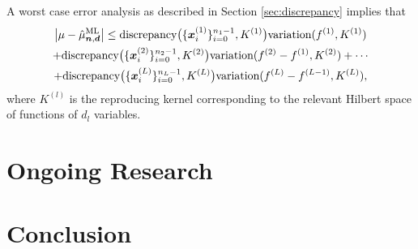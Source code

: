 \documentclass{svproc}
\begin{document}
A worst case error analysis as described in Section \ref{sec:discrepancy} implies that
\begin{multline*}
    \bigl \lvert \mu - \hat{\mu}^{\text{ML}}_{{\boldsymbol{n}},{\boldsymbol{d}}} \bigr \rvert \le 
    \text{discrepancy}\bigl(\{{\boldsymbol{x}}_i^{(1)}\}_{i=0}^{n_1-1}, K^{(1)} \bigr) \text{variation}(f^{(1)}, K^{(1)}) \\
    + \text{discrepancy}\bigl(\{{\boldsymbol{x}}_i^{(2)}\}_{i=0}^{n_2-1}, K^{(2)} \bigr) \text{variation}(f^{(2)} - f^{(1)}, K^{(2)}) + \cdots \\
    + \text{discrepancy}\bigl(\{{\boldsymbol{x}}_i^{(L)}\}_{i=0}^{n_L-1}, K^{(L)} \bigr) \text{variation}(f^{(L)} - f^{(L-1)}, K^{(L)}),
\end{multline*}
where $K^{(l)}$ is the reproducing kernel corresponding to the relevant  Hilbert space of functions of $d_l$ variables.


\section{Ongoing Research} \label{sec:onging}
\section{Conclusion} \label{sec:conclusion}





\end{document}
